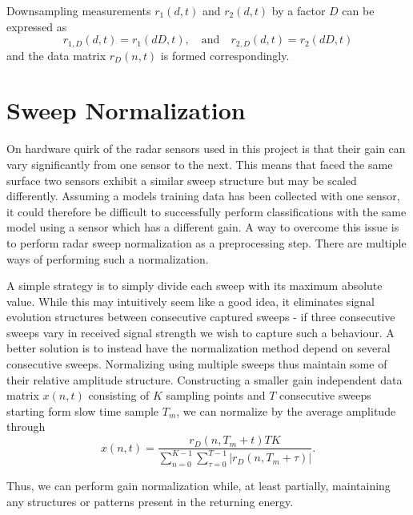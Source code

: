 Downsampling measurements $r_1(d,t)$ and $r_2(d,t)$ by a factor $D$ can be expressed as
\begin{equation}
\label{eq:downsamp}
	r_{1,D}(d, t) = r_{1}(dD,t), 
	\quad \text{and} \quad r_{2,D}(d,t) = r_{2}(dD,t)
\end{equation}
and the data matrix $r_D(n,t)$ is formed correspondingly.

\section{Sweep Normalization}\label{sec:norm}

On hardware quirk of the radar sensors used in this project is that their gain can vary significantly from one sensor to the next. This means that faced the same surface two sensors exhibit a similar sweep structure but may be scaled differently. Assuming a models training data has been collected with one sensor, it could therefore be difficult to successfully perform classifications with the same model using a sensor which has a different gain. A way to overcome this issue is to perform radar sweep normalization as a preprocessing step. There are multiple ways of performing such a normalization. %

A simple strategy is to simply divide each sweep with its maximum absolute value. While this may intuitively seem like a good idea, it eliminates signal evolution structures between consecutive captured sweeps - if three consecutive sweeps vary in received signal strength we wish to capture such a behaviour. A better solution is to instead have the normalization method depend on several consecutive sweeps. Normalizing using multiple sweeps thus maintain some of their relative amplitude structure. Constructing a smaller gain independent data matrix $x(n,t)$ consisting of $K$ sampling points and $T$ consecutive sweeps starting form slow time sample $T_m$, we can normalize by the average amplitude through
\begin{equation}
	x(n,t) = 
	\frac{r_D(n, T_m + t)TK}{\sum_{n=0}^{K-1}\sum_{\tau=0}^{T-1}|r_D(n, T_m+\tau)|}.
\end{equation}

Thus, we can perform gain normalization while, at least partially, maintaining any structures or patterns present in the returning energy. 


